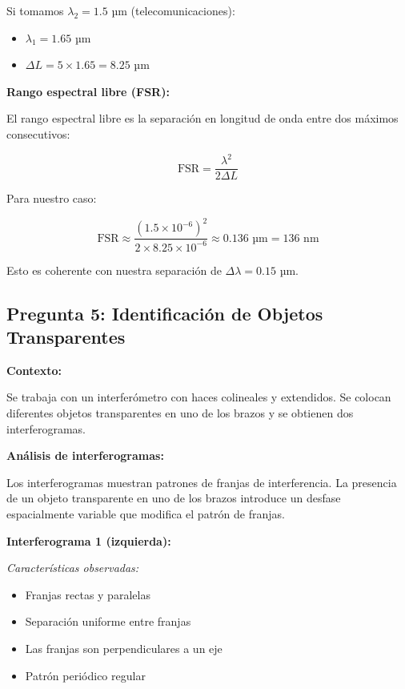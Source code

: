 \documentclass[12pt,a4paper]{article}
\begin{document}
Si tomamos $\lambda_2 = 1.5$ µm (telecomunicaciones):
\begin{itemize}
    \item $\lambda_1 = 1.65$ µm
    \item $\Delta L = 5 \times 1.65 = 8.25$ µm
\end{itemize}

\textbf{Rango espectral libre (FSR):}

El rango espectral libre es la separación en longitud de onda entre dos máximos consecutivos:

\begin{equation}
    \text{FSR} = \frac{\lambda^2}{2\Delta L}
\end{equation}

Para nuestro caso:

\begin{equation}
    \text{FSR} \approx \frac{(1.5 \times 10^{-6})^2}{2 \times 8.25 \times 10^{-6}} \approx 0.136 \text{ µm} = 136 \text{ nm}
\end{equation}

Esto es coherente con nuestra separación de $\Delta\lambda = 0.15$ µm.

\subsection{Pregunta 5: Identificación de Objetos Transparentes}

\textbf{Contexto:}

Se trabaja con un interferómetro con haces colineales y extendidos. Se colocan diferentes objetos transparentes en uno de los brazos y se obtienen dos interferogramas.

\textbf{Análisis de interferogramas:}

Los interferogramas muestran patrones de franjas de interferencia. La presencia de un objeto transparente en uno de los brazos introduce un desfase espacialmente variable que modifica el patrón de franjas.

\textbf{Interferograma 1 (izquierda):}

\textit{Características observadas:}
\begin{itemize}
    \item Franjas rectas y paralelas
    \item Separación uniforme entre franjas
    \item Las franjas son perpendiculares a un eje
    \item Patrón periódico regular
\end{itemize}
\end{document}
